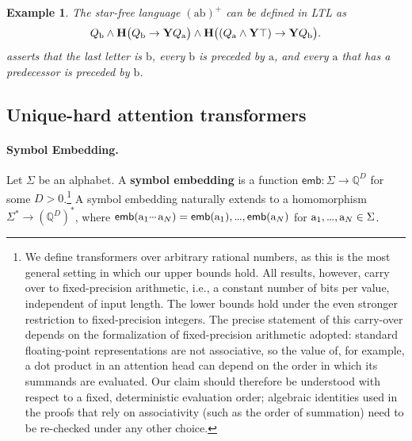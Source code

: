 \documentclass{article} %
\newtheorem{example}{Example}
\newcommand{\Q}{\mathbb{Q}}
\newcommand{\emb}{\mathsf{emb}}
\newcommand{\opbf}[1]{\textnormal{\textbf{#1}}}
\newcommand{\history}{\opbf{H}}
\newcommand{\yesterday}{\opbf{Y}}
\newcommand{\defn}[1]{\textbf{#1}}
\newcommand{\sym}[1]{\mathrm{#1}}
\newcommand{\alphabet}{\Sigma}
\newcommand{\Qprop}[1]{Q_{#1}}
\newcommand{\mydots}{%
  \ifmmode
    \mathord{.}\mkern-1mu\mathord{.}\mkern-1mu\mathord{.}%
  \else
    .\kern-0.1em.\kern-0.1em.%
  \fi
}
\newcommand{\mycdots}{%
  \ifmmode
    \mathord{\raisebox{0.45ex}{\ensuremath{\mydots}}}\mkern2mu%
  \else
    \raisebox{0.45ex}{.\kern-0.1em.\kern-0.1em.}\kern0.1em%
  \fi
}
\renewcommand{\cdots}{\mycdots}%
\renewcommand{\ldots}{\mydots}%
\renewcommand{\dots}{\mydots}%
\begin{document}
\begin{example}
    The star-free language $(\sym{a}\sym{b})^+$ can be defined in LTL as
    \begin{equation}\label{eq:ltl-formula}
        \Qprop{\sym{b}} \wedge \history\big( \Qprop{\sym{b}} \to \yesterday \Qprop{\sym{a}} \big) \wedge
        \history\big( (\Qprop{\sym{a}} \wedge \yesterday \top) \to \yesterday \Qprop{\sym{b}} \big).
    \end{equation}
     asserts that the last letter is $\sym{b}$, every $\sym{b}$ is preceded by
    $\sym{a}$, and every $\sym{a}$ that has a predecessor is preceded by $\sym{b}$.
\end{example}

\subsection{Unique-hard attention transformers}\label{subsec:uhat}

\paragraph{Symbol Embedding.}
Let $\alphabet$ be an alphabet.
A \defn{symbol embedding} is a function $\emb \colon \alphabet \to \Q^D$ for some $D > 0$.\footnote{We define transformers over arbitrary rational numbers, as this is the
most general setting in which our upper bounds hold. All results,
however, carry over to fixed-precision arithmetic, i.e., a constant
number of bits per value, independent of input length. The lower bounds
hold under the even stronger restriction to fixed-precision integers.
The precise statement of this carry-over depends on the formalization of fixed-precision arithmetic adopted: standard floating-point representations \citep{goldberg1991what} are not associative, so the value of, for example, a dot product in an attention head can depend on the order in which its summands are evaluated. Our claim should therefore be understood with respect to a fixed, deterministic evaluation order; algebraic identities used in the proofs that rely on associativity (such as the order of summation) need to be re-checked under any other choice.}
A symbol embedding naturally extends to a homomorphism $\alphabet^* \to (\Q^D)^*$,
where $\emb(\sym{a}_1\cdots \sym{a}_N) = \emb(\sym{a}_1), \ldots, \emb(\sym{a}_N)$ for $\sym{a}_1,\dots, \sym{a}_N \in \alphabet$.
\end{document}
